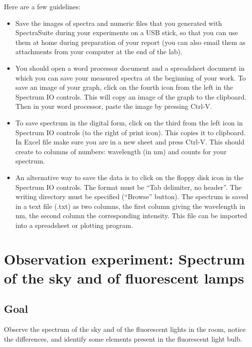 Here are a few guidelines:
\begin{itemize}
	\item Save the images of spectra and numeric files that you generated with SpectraSuite
	during your experiments on a USB stick, so that you can use them at home during
	preparation of your report (you can also email them as attachments from your
	computer at the end of the lab).
	
	\item You should open a word processor document and a spreadsheet document in which you can save your measured
	spectra at the beginning of your work. To save an image of your graph, click on
	the fourth icon from the left in the Spectrum IO controls. %
	This will copy
	an image of the graph to the clipboard. Then in your word processor, paste the image by pressing
	Ctrl-V.
	
	\item To save spectrum in the digital form, click on the third from the left icon in
	Spectrum IO controls (to the right of print icon). This copies it to clipboard. In
	Excel file make sure you are in a new sheet and press Ctrl-V. This should create
	to columns of numbers: wavelength (in nm) and counts for your spectrum.
	
	\item An alternative way to save the data is to click on the floppy disk icon in the
	Spectrum IO controls. The format must be ``Tab delimiter, no header''. The
	writing directory must be specified (``Browse'' button). The spectrum is saved in a
	text file (.txt) as two columns, the first column giving the wavelength in nm, the
	second column the corresponding intensity. This file can be imported into a spreadsheet or plotting program.
\end{itemize}

\section{Observation experiment: Spectrum of the sky and of fluorescent lamps}

\subsection{Goal}

Observe the spectrum of the sky and of the fluorescent lights in the room, notice the differences, and identify some elements present in the fluorescent light bulb.


